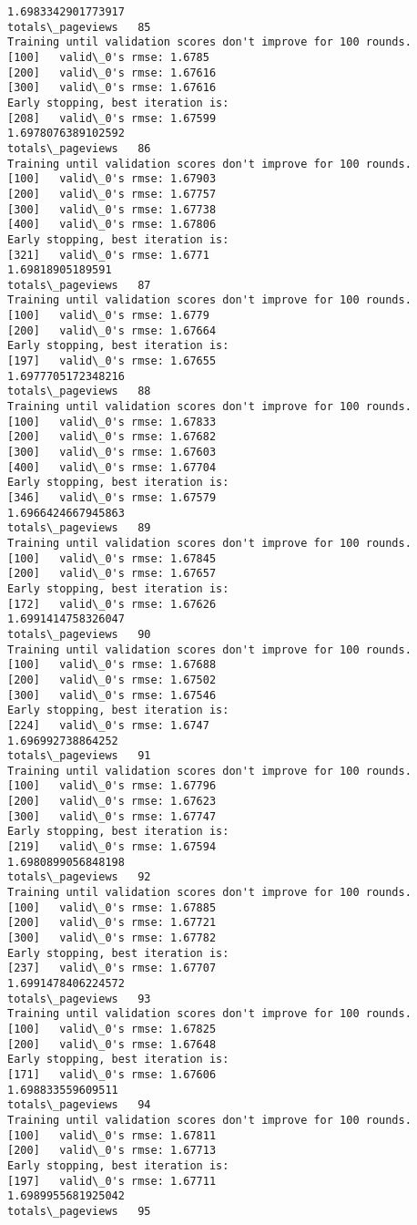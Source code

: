 \documentclass[11pt]{article}
\begin{document}
\begin{Verbatim}[commandchars=\\\{\}]
1.6983342901773917
totals\_pageviews   85
Training until validation scores don't improve for 100 rounds.
[100]	valid\_0's rmse: 1.6785
[200]	valid\_0's rmse: 1.67616
[300]	valid\_0's rmse: 1.67616
Early stopping, best iteration is:
[208]	valid\_0's rmse: 1.67599
1.6978076389102592
totals\_pageviews   86
Training until validation scores don't improve for 100 rounds.
[100]	valid\_0's rmse: 1.67903
[200]	valid\_0's rmse: 1.67757
[300]	valid\_0's rmse: 1.67738
[400]	valid\_0's rmse: 1.67806
Early stopping, best iteration is:
[321]	valid\_0's rmse: 1.6771
1.69818905189591
totals\_pageviews   87
Training until validation scores don't improve for 100 rounds.
[100]	valid\_0's rmse: 1.6779
[200]	valid\_0's rmse: 1.67664
Early stopping, best iteration is:
[197]	valid\_0's rmse: 1.67655
1.6977705172348216
totals\_pageviews   88
Training until validation scores don't improve for 100 rounds.
[100]	valid\_0's rmse: 1.67833
[200]	valid\_0's rmse: 1.67682
[300]	valid\_0's rmse: 1.67603
[400]	valid\_0's rmse: 1.67704
Early stopping, best iteration is:
[346]	valid\_0's rmse: 1.67579
1.6966424667945863
totals\_pageviews   89
Training until validation scores don't improve for 100 rounds.
[100]	valid\_0's rmse: 1.67845
[200]	valid\_0's rmse: 1.67657
Early stopping, best iteration is:
[172]	valid\_0's rmse: 1.67626
1.6991414758326047
totals\_pageviews   90
Training until validation scores don't improve for 100 rounds.
[100]	valid\_0's rmse: 1.67688
[200]	valid\_0's rmse: 1.67502
[300]	valid\_0's rmse: 1.67546
Early stopping, best iteration is:
[224]	valid\_0's rmse: 1.6747
1.696992738864252
totals\_pageviews   91
Training until validation scores don't improve for 100 rounds.
[100]	valid\_0's rmse: 1.67796
[200]	valid\_0's rmse: 1.67623
[300]	valid\_0's rmse: 1.67747
Early stopping, best iteration is:
[219]	valid\_0's rmse: 1.67594
1.6980899056848198
totals\_pageviews   92
Training until validation scores don't improve for 100 rounds.
[100]	valid\_0's rmse: 1.67885
[200]	valid\_0's rmse: 1.67721
[300]	valid\_0's rmse: 1.67782
Early stopping, best iteration is:
[237]	valid\_0's rmse: 1.67707
1.6991478406224572
totals\_pageviews   93
Training until validation scores don't improve for 100 rounds.
[100]	valid\_0's rmse: 1.67825
[200]	valid\_0's rmse: 1.67648
Early stopping, best iteration is:
[171]	valid\_0's rmse: 1.67606
1.698833559609511
totals\_pageviews   94
Training until validation scores don't improve for 100 rounds.
[100]	valid\_0's rmse: 1.67811
[200]	valid\_0's rmse: 1.67713
Early stopping, best iteration is:
[197]	valid\_0's rmse: 1.67711
1.6989955681925042
totals\_pageviews   95

\end{Verbatim}
\end{document}

